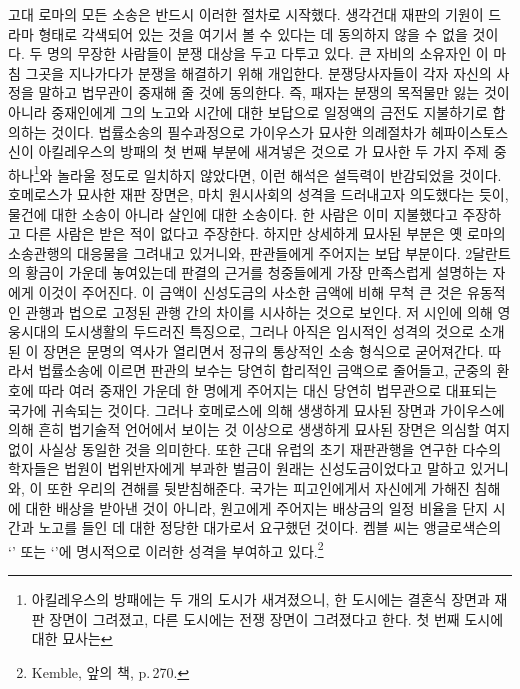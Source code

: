 고대 로마의 모든 소송은 반드시 이러한 절차로 시작했다.
생각건대
재판의 기원이 드라마 형태로 각색되어 있는 것을
여기서
볼 수 있다는 데
동의하지 않을 수 없을 것이다.
두 명의 무장한 사람들이 분쟁 대상을 두고 다투고 있다.
큰 자비의 소유자인 이 마침
그곳을 지나가다가 분쟁을 해결하기 위해 개입한다.
분쟁당사자들이 각자 자신의 사정을 말하고
법무관이 중재해 줄 것에 동의한다.
즉, 패자는 분쟁의 목적물만 잃는 것이 아니라
중재인에게 그의 노고와 시간에 대한 보답으로
일정액의 금전도 지불하기로 합의하는 것이다.
법률소송의 필수과정으로
가이우스가 묘사한
의례절차가
헤파이스토스 신이
아킬레우스의 방패의 첫 번째 부분에 새겨넣은 것으로
가 묘사한
두 가지 주제 중 하나\footnote{%
  아킬레우스의 방패에는 두 개의 도시가 새겨졌으니,
  한 도시에는 결혼식 장면과 재판 장면이 그려졌고,
  다른 도시에는 전쟁 장면이 그려졌다고 한다.
  첫 번째 도시에 대한 묘사는
}와
놀라울 정도로 일치하지 않았다면,
이런 해석은
설득력이 반감되었을 것이다.
%
호메로스가 묘사한 재판 장면은,
마치 원시사회의 성격을 드러내고자 의도했다는 듯이,
물건에 대한 소송이 아니라
살인에 대한  소송이다.
한 사람은 이미 지불했다고 주장하고
다른 사람은 받은 적이 없다고 주장한다.
하지만 상세하게 묘사된 부분은
옛 로마의 소송관행의 대응물을 그려내고 있거니와,
판관들에게 주어지는 보답 부분이다.
2달란트의 황금이 가운데 놓여있는데
판결의 근거를 청중들에게 가장 만족스럽게 설명하는 자에게
이것이 주어진다.
이 금액이 신성도금의 사소한 금액에 비해 무척 큰 것은
유동적인 관행과 법으로 고정된 관행 간의 차이를 시사하는 것으로 보인다.
저 시인에 의해
영웅시대의 도시생활의 두드러진 특징으로,
그러나 아직은 임시적인 성격의 것으로
소개된 이 장면은
문명의 역사가 열리면서
정규의 통상적인 소송 형식으로 굳어져간다.
따라서
법률소송에 이르면 판관의 보수는
당연히 합리적인 금액으로 줄어들고,
군중의 환호에 따라 여러 중재인 가운데 한 명에게 주어지는 대신
당연히 법무관으로 대표되는 국가에 귀속되는 것이다.
그러나
호메로스에 의해 생생하게 묘사된 장면과
가이우스에 의해
흔히 법기술적 언어에서 보이는 것 이상으로 생생하게
묘사된 장면은 의심할 여지 없이
사실상 동일한 것을 의미한다.
또한
근대 유럽의 초기 재판관행을 연구한 다수의 학자들은
법원이 법위반자에게 부과한 벌금이 원래는 신성도금이었다고
말하고 있거니와, 이 또한
우리의 견해를 뒷받침해준다.
국가는
피고인에게서
자신에게 가해진 침해에 대한 배상을
받아낸 것이 아니라,
원고에게 주어지는 배상금의 일정 비율을
단지
시간과 노고를 들인 데 대한 정당한 대가로서
요구했던 것이다.
켐블 씨는 앵글로색슨의
`' 또는 `'에
명시적으로
이러한 성격을
부여하고 있다.\footnote{Kemble, 앞의 책, p.\,270.}

